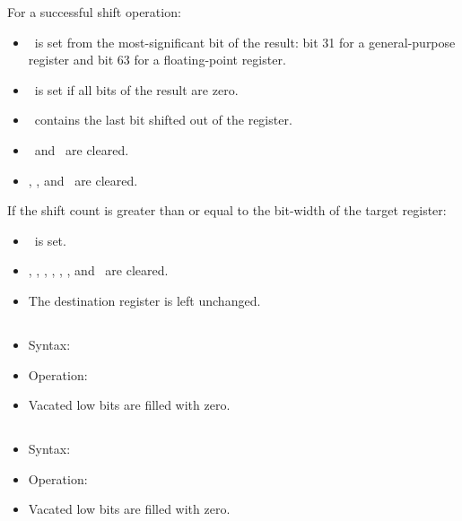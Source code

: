 For a successful shift operation:

\begin{itemize}
\item \flagN\ is set from the most-significant bit of the result:
bit 31 for a general-purpose register and bit 63 for a floating-point register.
\item \flagZ\ is set if all bits of the result are zero.
\item \flagC\ contains the last bit shifted out of the register.
\item \flagV\ and \flagE\ are cleared.
\item \flagI, \flagU, and \flagX\ are cleared.
\end{itemize}

If the shift count is greater than or equal to the bit-width of the target register:

\begin{itemize}
\item \flagE\ is set.
\item \flagN, \flagZ, \flagC, \flagV, \flagI, \flagU, and \flagX\ are cleared.
\item The destination register is left unchanged.
\end{itemize}

\subsection{}

\begin{itemize}
\item Syntax: 
\item Operation: 
\item Vacated low bits are filled with zero.
\end{itemize}

\subsection{}

\begin{itemize}
\item Syntax: 
\item Operation: 
\item Vacated low bits are filled with zero.
\end{itemize}

